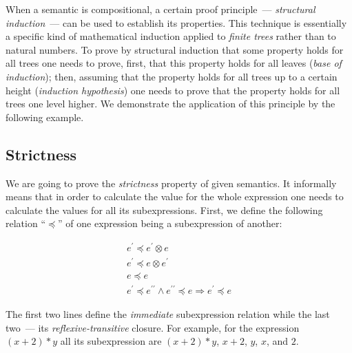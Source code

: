 When a semantic is compositional, a certain proof principle~--- \emph{structural induction}~--- can be used to establish
its properties. This technique is essentially a specific kind of mathematical induction applied to \emph{finite trees} rather than to
natural numbers. To prove by structural induction that some property holds for all trees one needs to prove, first, that this
property holds for all leaves (\emph{base of induction}); then, assuming that the property holds for all trees up to a certain
height (\emph{induction hypothesis}) one needs to prove that the property holds for all trees one level higher. We demonstrate
the application of this principle by the following example.

\subsection{Strictness}

We are going to prove the \emph{strictness} property of given semantics. It informally means that in order to calculate the
value for the whole expression one needs to calculate the values for all its subexpressions. First, we define the
following relation ``$\preceq$'' of one expression being a subexpression of another:

\[
\begin{array}{c}
  e^\prime \preceq e^\prime\otimes e \\
  e^\prime \preceq e\otimes e^\prime \\
  e\preceq e \\
  e^\prime\preceq e^{\prime\prime} \wedge e^{\prime\prime}\preceq e \Rightarrow e^\prime\preceq e
\end{array}  
\]

The first two lines define the \emph{immediate} subexpression relation while the last two~--- its \emph{reflexive-transitive}
closure. For example, for the expression $(x+2)*y$ all its subexpression are $(x+2)*y$, $x+2$, $y$, $x$, and $2$. 

